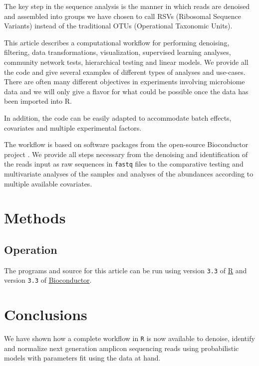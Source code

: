 \documentclass[9pt,a4paper]{extarticle}\usepackage[]{graphicx}\usepackage[]{color}
\begin{document}
The key step in the sequence analysis is the manner in which reads are
denoised and assembled into groups we have chosen to call {RSVs (Ribosomal Sequence Variants)} instead of
the traditional {OTUs (Operational Taxonomic Units)}.

This article describes a computational workflow for performing
denoising, filtering, data transformations, visualization,
supervised learning analyses, community network tests,
hierarchical testing and linear models. We provide all the code and give
several examples of different types of analyses and use-cases.
There are often many
different objectives in experiments involving microbiome data and we
will only give a flavor for what could be possible once the data has
been imported into R.


In addition, the code can be easily adapted to accommodate batch
effects, covariates and multiple experimental factors.

The workflow is based on software packages from the open-source
Bioconductor project \citep{Huber:2015}.  We provide all steps
necessary from the denoising and identification of the reads input as
raw sequences in {\tt fastq} files to the comparative testing and multivariate
analyses of the
samples and analyses of the abundances according to multiple available
covariates.

\section*{Methods}







\subsection*{Operation}
The programs and source for this article can be run using version {\tt 3.3}
of \href{https://cran.r-project.org}{R} and version {\tt 3.3} of \href{https://www.bioconductor.org/install/}{Bioconductor}.


\section*{Conclusions} %
We have shown how a complete workflow in {\tt R} is now available to denoise, identify
and normalize next generation amplicon sequencing reads
using probabilistic models with parameters fit using the data at hand.
\end{document}
